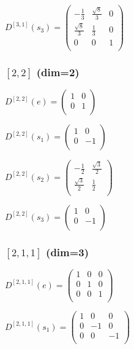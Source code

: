 \documentclass{article}
\begin{document}
$D^{[3,1]}(s_3) = \begin{pmatrix}
  -\frac{1}{3} & \frac{\sqrt{8}}{3} & 0 \\
  \frac{\sqrt{8}}{3} & \frac{1}{3} & 0 \\
  0 & 0 & 1 \\
\end{pmatrix}$

\subsubsection*{$[2,2]$ (dim=2)}

$D^{[2,2]}(e) = \begin{pmatrix}
  1 & 0 \\
  0 & 1 \\
\end{pmatrix}$

$D^{[2,2]}(s_1) = \begin{pmatrix}
  1 & 0 \\
  0 & -1 \\
\end{pmatrix}$

$D^{[2,2]}(s_2) = \begin{pmatrix}
  -\frac{1}{2} & \frac{\sqrt{3}}{2} \\
  \frac{\sqrt{3}}{2} & \frac{1}{2} \\
\end{pmatrix}$

$D^{[2,2]}(s_3) = \begin{pmatrix}
  1 & 0 \\
  0 & -1 \\
\end{pmatrix}$

\subsubsection*{$[2,1,1]$ (dim=3)}

$D^{[2,1,1]}(e) = \begin{pmatrix}
  1 & 0 & 0 \\
  0 & 1 & 0 \\
  0 & 0 & 1 \\
\end{pmatrix}$

$D^{[2,1,1]}(s_1) = \begin{pmatrix}
  1 & 0 & 0 \\
  0 & -1 & 0 \\
  0 & 0 & -1 \\
\end{pmatrix}$
\end{document}
